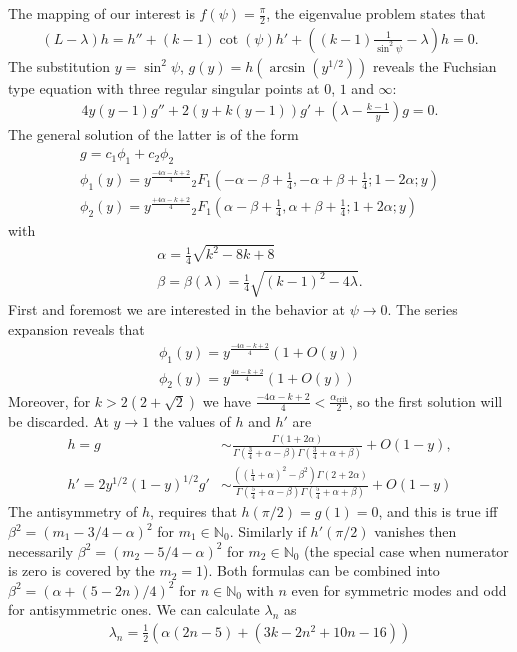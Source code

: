 The mapping of our interest is $f(\psi)=\frac{\pi}{2}$, the eigenvalue
problem states that
\begin{gather}\label{eq:problem}
  (L-\lambda)h=h''+(k-1)\cot(\psi)h'+((k-1)\frac{1}{\sin^2\psi}-\lambda)h=0.
\end{gather}
The substitution $y=\sin^2\psi$, $g(y)=h(\arcsin(y^{1/2}))$ reveals
the Fuchsian type equation with three regular singular points at $0$,
$1$ and $\infty$:
\begin{gather}
  4y(y-1)g''+2(y+k(y-1))g'+(\lambda-\frac{k-1}{y})g=0.
\end{gather}
The general solution of the latter is of the form
\begin{gather}
  g=c_1\phi_1+c_2\phi_2\\
  \phi_1(y)=y^{\frac{-4\alpha-k+2}{4}}{}_2F_1 \left(-\alpha-\beta+\frac{1}{4},-\alpha+\beta+\frac{1}{4};1-2\alpha;y\right)\\
  \phi_2(y)=y^{\frac{+4\alpha-k+2}{4}}{}_2F_1 \left(\alpha-\beta+\frac{1}{4},\alpha+\beta+\frac{1}{4};1+2\alpha;y\right)\label{eq:sol}
\end{gather}
with
\begin{gather}
  \alpha=\frac{1}{4}\sqrt{k^2-8 k+8}\\
  \beta=\beta(\lambda)=\frac{1}{4}\sqrt{(k-1)^2-4\lambda}.
\end{gather}
First and foremost we are interested in the behavior at
$\psi\rightarrow0$. The series expansion reveals that
\begin{gather}
  \phi_1(y)=y^{\frac{-4\alpha-k+2}{4}}(1+O(y))\\
  \phi_2(y)=y^{\frac{4\alpha-k+2}{4}}(1+O(y))
\end{gather}
Moreover, for $k>2(2+\sqrt{2})$ we
have $\frac{-4\alpha-k+2}{4}<\frac{\alpha_{\text{crit}}}{2}$, so the
first solution will be discarded. At $y\rightarrow1$ the values of $h$
and $h'$ are
\begin{align}
  h=g&
  \sim\frac{\Gamma(1+2\alpha)}{\Gamma(\frac{3}{4}+\alpha-\beta)\Gamma(\frac{3}{4}+\alpha+\beta)}+O(1-y),\\
  h'=2y^{1/2}(1-y)^{1/2}g'&
  \sim\frac{((\frac{1}{4}+\alpha)^2-\beta^2)\Gamma(2+2\alpha)}{\Gamma(\frac{5}{4}+\alpha-\beta)\Gamma(\frac{5}{4}+\alpha+\beta)}+O(1-y)
\end{align}
The antisymmetry of $h$, requires that $h(\pi/2)=g(1)=0$, and this is
true iff $\beta^2=(m_1-3/4-\alpha)^2$ for
$m_1\in\mathbb{N}_0$. Similarly if $h'(\pi/2)$ vanishes then
necessarily $\beta^2=(m_2-5/4-\alpha)^2$ for $m_2\in\mathbb{N}_0$ (the
special case when numerator is zero is covered by the $m_2=1$). Both
formulas can be combined into $\beta^2=(\alpha+(5-2n)/4)^2$ for
$n\in\mathbb{N}_0$ with $n$ even for symmetric modes and odd for
antisymmetric ones. We can calculate $\lambda_n$ as
\begin{align}
  \lambda_n=\frac{1}{2}(\alpha(2n-5)+(3k-2n^2+10n-16))
\end{align}

